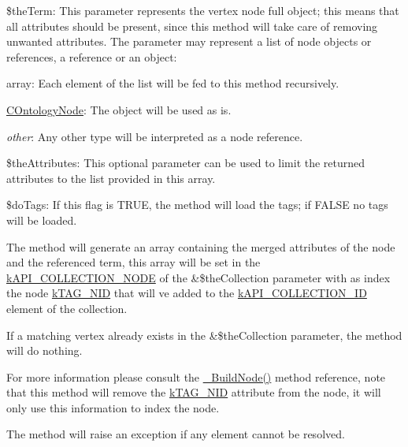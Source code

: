 \begin{DoxyItemize}
\begin{DoxyItemize}
\end{DoxyItemize}
\item {\ttfamily \$the\-Term}\-: This parameter represents the vertex node full object; this means that all attributes should be present, since this method will take care of removing unwanted attributes. The parameter may represent a list of node objects or references, a reference or an object\-: 
\begin{DoxyItemize}
\item {\ttfamily array}\-: Each element of the list will be fed to this method recursively. 
\item {\ttfamily \hyperlink{class_c_ontology_node}{C\-Ontology\-Node}}\-: The object will be used as is. 
\item {\itshape other}\-: Any other type will be interpreted as a node reference. 
\end{DoxyItemize}
\item {\ttfamily \$the\-Attributes}\-: This optional parameter can be used to limit the returned attributes to the list provided in this array. 
\item {\ttfamily \$do\-Tags}\-: If this flag is {\ttfamily T\-R\-U\-E}, the method will load the tags; if {\ttfamily F\-A\-L\-S\-E} no tags will be loaded. 
\end{DoxyItemize}

The method will generate an array containing the merged attributes of the node and the referenced term, this array will be set in the \hyperlink{}{k\-A\-P\-I\-\_\-\-C\-O\-L\-L\-E\-C\-T\-I\-O\-N\-\_\-\-N\-O\-D\-E} of the {\ttfamily \&\$the\-Collection} parameter with as index the node \hyperlink{}{k\-T\-A\-G\-\_\-\-N\-I\-D} that will ve added to the \hyperlink{}{k\-A\-P\-I\-\_\-\-C\-O\-L\-L\-E\-C\-T\-I\-O\-N\-\_\-\-I\-D} element of the collection.

If a matching vertex already exists in the {\ttfamily \&\$the\-Collection} parameter, the method will do nothing.

For more information please consult the \hyperlink{class_c_ontology_wrapper_a3149d34bb488513db2d572f3002bebce}{\-\_\-\-Build\-Node()} method reference, note that this method will remove the \hyperlink{}{k\-T\-A\-G\-\_\-\-N\-I\-D} attribute from the node, it will only use this information to index the node.

The method will raise an exception if any element cannot be resolved.


